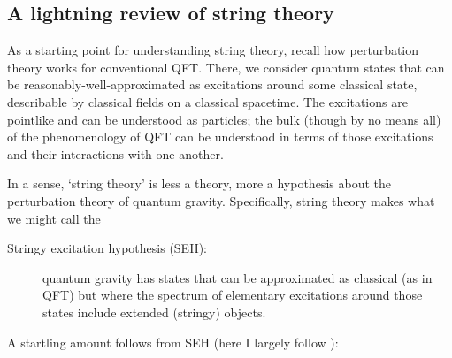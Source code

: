 \documentclass{article}
\begin{document}
\subsection{A lightning review of string theory}

As a starting point for understanding string theory, recall how perturbation theory works for conventional QFT. There, we consider quantum states that can be reasonably-well-approximated as excitations around some classical state, describable by classical fields on a classical spacetime. The excitations are pointlike and can be understood as particles; the bulk (though by no means all) of the phenomenology of QFT can be understood in terms of those excitations and their interactions with one another.

In a sense, `string theory' is less a theory, more a hypothesis about the perturbation theory of quantum gravity. Specifically, string theory makes what we might call the 
\begin{description}
\item[Stringy excitation hypothesis (SEH):] quantum gravity has states that can be approximated as classical (as in QFT) but where the spectrum of elementary excitations around those states include extended (stringy) objects.
\end{description}
A startling amount follows from SEH (here I largely follow ):
\end{document}
